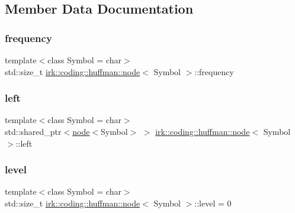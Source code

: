 \subsection{Member Data Documentation}
\mbox{\label{structirk_1_1coding_1_1huffman_1_1node_ae303f67bca534f5fcbf2a64a586cd7a9}} 
\subsubsection{\texorpdfstring{frequency}{frequency}}
{\footnotesize\ttfamily template$<$class Symbol = char$>$ \\
std\+::size\+\_\+t \mbox{\hyperlink{structirk_1_1coding_1_1huffman_1_1node}{irk\+::coding\+::huffman\+::node}}$<$ Symbol $>$\+::frequency}

\mbox{\label{structirk_1_1coding_1_1huffman_1_1node_ac4303bd6570125c1d18506a8596f3b8f}} 
\subsubsection{\texorpdfstring{left}{left}}
{\footnotesize\ttfamily template$<$class Symbol = char$>$ \\
std\+::shared\+\_\+ptr$<$\mbox{\hyperlink{structirk_1_1coding_1_1huffman_1_1node}{node}}$<$Symbol$>$ $>$ \mbox{\hyperlink{structirk_1_1coding_1_1huffman_1_1node}{irk\+::coding\+::huffman\+::node}}$<$ Symbol $>$\+::left}

\mbox{\label{structirk_1_1coding_1_1huffman_1_1node_ae34639865753731eb74aaae1244442e7}} 
\subsubsection{\texorpdfstring{level}{level}}
{\footnotesize\ttfamily template$<$class Symbol = char$>$ \\
std\+::size\+\_\+t \mbox{\hyperlink{structirk_1_1coding_1_1huffman_1_1node}{irk\+::coding\+::huffman\+::node}}$<$ Symbol $>$\+::level = 0}

